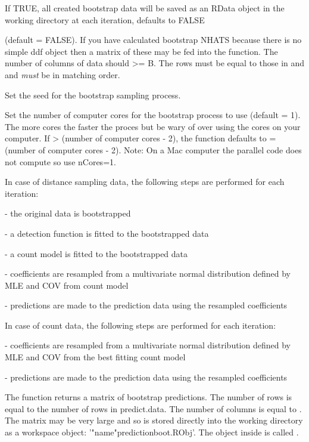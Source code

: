 \documentclass[a4paper]{book}
\begin{document}
\begin{Arguments}
\begin{ldescription}
\item[\code{save.data}] If TRUE, all created bootstrap data will be saved as an RData object in the working directory at each iteration, defaults to FALSE

\item[\code{nhats}] (default = FALSE).  If you have calculated bootstrap NHATS because there is no simple ddf object then a matrix of these may be fed into the function.  The number of columns of data should >= B.  The rows must be equal to those in  and  and \emph{must} be in matching order.

\item[\code{seed}] Set the seed for the bootstrap sampling process.

\item[\code{nCores}] Set the number of computer cores for the bootstrap process to use (default = 1).  The more cores the faster the proces but be wary of over using the cores on your computer. If  > (number of computer cores - 2), the function defaults to  = (number of computer cores - 2).  Note: On a Mac computer the parallel code does not compute so use nCores=1.
\end{ldescription}
\end{Arguments}
%
\begin{Details}\relax
In case of distance sampling data, the following steps are performed for each iteration: 

- the original data is bootstrapped

- a detection function is fitted to the bootstrapped data

- a count model is fitted to the bootstrapped data

- coefficients are resampled from a multivariate normal distribution defined by MLE and COV from count model

- predictions are made to the prediction data using the resampled coefficients 

In case of count data, the following steps are performed for each iteration:

- coefficients are resampled from a multivariate normal distribution defined by MLE and COV from the best fitting count model

- predictions are made to the prediction data using the resampled coefficients
\end{Details}
%
\begin{Value}
The function returns a matrix of bootstrap predictions. The number of rows is equal to the number of rows in predict.data.  The number of columns is equal to .  The matrix may be very large and so is stored directly into the working directory as a workspace object: '"name"predictionboot.RObj'.  The object inside is called .
\end{Value}
\end{document}
